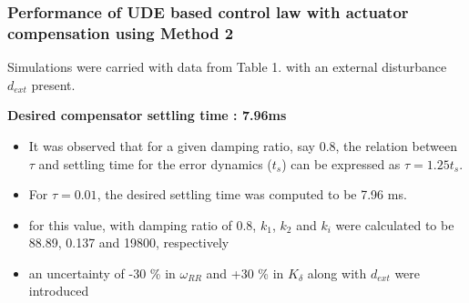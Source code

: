 \documentclass[table,10pt,red]{beamer}	%
\begin{document}
\begin{frame}
\frametitle{Performance of UDE based control law with actuator compensation using Method 2}
Simulations were carried with data from Table 1. with an external disturbance $d_{ext}$ present.

\textbf{Desired compensator settling time : 7.96ms}
\begin{itemize}
\item It was observed that for a given damping ratio, say 0.8, the relation between $\tau$ and settling time for the error dynamics ($t_s$) can be expressed as $\tau=1.25 t_s$.
\item For $\tau=0.01$, the desired settling time was computed to be 7.96 ms.
		\item for this value, with damping ratio of 0.8, $k_1$, $k_2$ and $k_i$ were calculated to be 88.89, 0.137 and 19800, respectively
		\item an uncertainty of -30 \% in $\omega_{RR}$ and +30 \% in $K_{\delta}$ along with $d_{ext}$ were introduced
\end{itemize}
\end{frame}
\end{document}

